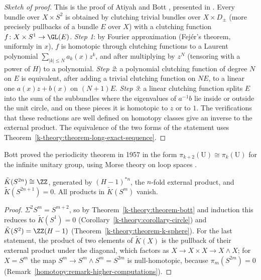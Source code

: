 \begin{proof}[Sketch of proof]
This is the proof of Atiyah and Bott \cite{atiyah-bott-1964}, presented in \cite[Chapter 2]{hatcher-vbkt}. Every bundle over $X \times S^2$ is obtained by clutching trivial bundles over $X \times D_\pm$ (more precisely
pullbacks of a bundle $E$ over $X$) with a clutching function $f \colon X \times S^1 \to \GL(E)$. \emph{Step 1}: by Fourier approximation (Fej\'er's theorem, uniformly in $x$), $f$ is homotopic through clutching
functions to a Laurent polynomial $\sum_{|k| \leq N}a_k(x)z^k$, and after multiplying by $z^N$ (tensoring with a power of $H$) to a polynomial. \emph{Step 2}: a polynomial clutching function of degree $N$ on $E$ is
equivalent, after adding a trivial clutching function on $NE$, to a linear one $a(x)z + b(x)$ on $(N + 1)E$. \emph{Step 3}: a linear clutching function splits $E$ into the sum of the subbundles where the
eigenvalues of $a^{-1}b$ lie inside or outside the unit circle, and on these pieces it is homotopic to $z$ or to $1$. The verifications that these reductions are well defined on homotopy classes give an inverse
to the external product. The equivalence of the two forms of the statement uses Theorem~\ref{k-theory:theorem-long-exact-sequence}.
\end{proof}

Bott proved the periodicity theorem in 1957 in the form $\pi_{k+2}(\mathrm{U}) \cong \pi_k(\mathrm{U})$ for the infinite unitary group, using Morse theory on loop spaces \cite{bott-1959}.

\begin{corollary}\label{k-theory:corollary-spheres}
$\tilde{K}(S^{2n}) \cong \ZZ$, generated by $(H - 1)^{*n}$, the $n$-fold external product, and $\tilde{K}(S^{2n+1}) = 0$. All products in $\tilde{K}(S^m)$ vanish.
\end{corollary}

\begin{proof}
$\Sigma^2S^m = S^{m+2}$, so by Theorem~\ref{k-theory:theorem-bott} and induction this reduces to $\tilde{K}(S^1) = 0$ (Corollary~\ref{k-theory:corollary-circle}) and $\tilde{K}(S^2) = \ZZ(H - 1)$
(Theorem~\ref{k-theory:theorem-k-sphere}). For the last statement, the product of two elements of $\tilde{K}(X)$ is the pullback of their external product under the diagonal, which factors as
$X \to X \times X \to X \wedge X$; for $X = S^m$ the map $S^m \to S^m \wedge S^m = S^{2m}$ is null-homotopic, because $\pi_m(S^{2m}) = 0$ (Remark~\ref{homotopy:remark-higher-computations}).
\end{proof}

